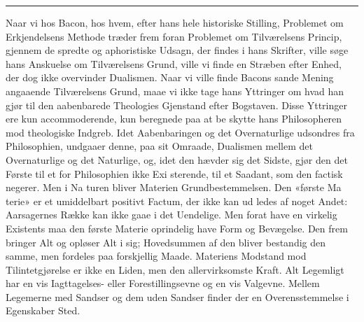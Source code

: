 \documentclass[12pt,a4paper]{book}
\newcommand{\divrule}{\begin{center}\rule{2cm}{0.4pt}\end{center}}
\begin{document}
\divrule

Naar vi hos Bacon, hos hvem, efter hans hele historiske
Stilling, Problemet om Erkjendelsens Methode træder frem
foran Problemet om Tilværelsens Princip, gjennem de spredte
og aphoristiske Udsagn, der findes i hans Skrifter, ville søge
hans Anskuelse om Tilværelsens Grund, ville vi finde en Stræben
efter Enhed, der dog ikke overvinder Dualismen. Naar vi ville
finde Bacons sande Mening angaaende Tilværelsens Grund,
maae vi ikke tage hans Yttringer om hvad han gjør til den
aabenbarede Theologies Gjenstand efter Bogstaven. Disse
Yttringer ere kun accommoderende, kun beregnede paa at be\-%
skytte hans Philosopheren mod theologiske Indgreb. Idet
Aabenbaringen og det Overnaturlige udsondres fra Philosophien,
undgaaer denne, paa sit Omraade, Dualismen mellem det
Overnaturlige og det Naturlige, og, idet den hævder sig det
Sidste, gjør den det Første til et for Philosophien ikke Exi\-%
sterende, til et Saadant, som den factisk negerer. Men i Na\-%
turen bliver Materien Grundbestemmelsen. Den «første Ma\-%
terie» er et umiddelbart positivt Factum, der ikke kan ud\-%
ledes af noget Andet: Aarsagernes Række kan ikke gaae i det
Uendelige. Men forat have en virkelig Existents maa den
første Materie oprindelig have Form og Bevægelse. Den frem\-%
bringer Alt og opløser Alt i sig; Hovedsummen af den bliver
bestandig den samme, men fordeles paa forskjellig Maade.
Materiens Modstand mod Tilintetgjørelse er ikke en Liden,
men den allervirksomste Kraft. Alt Legemligt har en vis
Iagttagelses- eller Forestillingsevne og en vis Valgevne.
Mellem Legemerne med Sandser og dem uden Sandser finder
der en Overensstemmelse i Egenskaber Sted.
\end{document}
